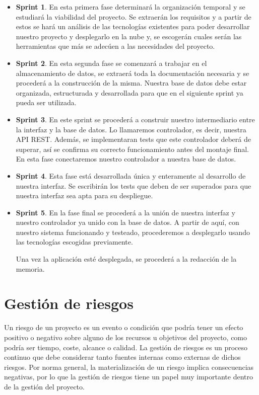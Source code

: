\begin{itemize}
    \item \textbf{Sprint 1}. En esta primera fase determinará la organización temporal y se estudiará la viabilidad del proyecto. Se extraerán los requisitos y a partir de estos se hará un análisis de las tecnologías existentes para poder desarrollar nuestro proyecto y desplegarlo en la nube y, se escogerán cuales serán las herramientas que más se adecúen a las necesidades del proyecto.
    
    \item \textbf{Sprint 2}. En esta segunda fase se comenzará a trabajar en el almacenamiento de datos, se extraerá toda la documentación necesaria y se procederá a la construcción de la misma. Nuestra base de datos debe estar organizada, estructurada y desarrollada para que en el siguiente sprint ya pueda ser utilizada.
    \item \textbf{Sprint 3}. En este sprint se procederá a construir nuestro intermediario entre la interfaz y la base de datos. Lo llamaremos controlador, es decir, nuestra API REST. Además, se implementaran tests que este controlador deberá de superar, así se confirma su correcto funcionamiento antes del montaje final. En esta fase conectaremos nuestro controlador a nuestra base de datos.
    \item \textbf{Sprint 4}. Esta fase está desarrollada única y enteramente al desarrollo de nuestra interfaz. Se escribirán los tests que deben de ser superados para que nuestra interfaz sea apta para su despliegue.
    \item \textbf{Sprint 5}. En la fase final se procederá a la unión de nuestra interfaz y nuestro controlador ya unido con la base de datos. A partir de aquí, con nuestro sistema funcionando y testeado, procederemos a desplegarlo usando las tecnologías escogidas previamente. 
    
    Una vez la aplicación esté desplegada, se procederá a la redacción de la memoria.
\end{itemize}

\section{Gestión de riesgos}
Un riesgo de un proyecto es un evento o condición  que podría tener un efecto positivo o negativo sobre alguno de los recursos u objetivos del proyecto, como podría ser tiempo, coste, alcance o calidad. La gestión de riesgos es un proceso continuo que debe considerar tanto fuentes internas como externas de dichos riesgos. Por norma general, la materialización de un riesgo implica consecuencias negativas, por lo que la gestión de riesgos tiene un papel muy importante dentro de la gestión del proyecto. 

